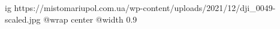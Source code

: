  
 
 
 
 

\ifcmt
  ig https://mistomariupol.com.ua/wp-content/uploads/2021/12/dji_0049-scaled.jpg
  @wrap center
  @width 0.9
\fi
